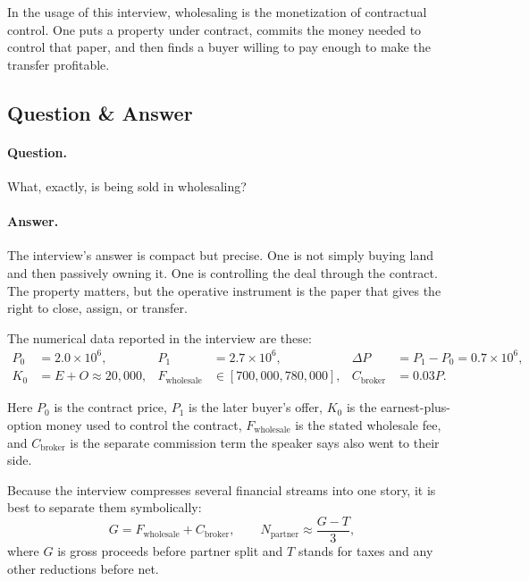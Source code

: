 \begin{definition}
In the usage of this interview, wholesaling is the monetization of contractual control. One puts a property under contract, commits the money needed to control that paper, and then finds a buyer willing to pay enough to make the transfer profitable.
\end{definition}

\subsection{Question \& Answer}

\paragraph{Question.} What, exactly, is being sold in wholesaling?

\paragraph{Answer.} The interview's answer is compact but precise. One is not simply buying land and then passively owning it. One is controlling the deal through the contract. The property matters, but the operative instrument is the paper that gives the right to close, assign, or transfer.

The numerical data reported in the interview are these:
\begin{align}
P_0 &= 2.0\times 10^6,
&
P_1 &= 2.7\times 10^6,
&
\Delta P &= P_1-P_0 = 0.7\times 10^6, \\
K_0 &= E+O \approx 20{,}000,
&
F_{\mathrm{wholesale}} &\in [700{,}000,780{,}000],
&
C_{\mathrm{broker}} &= 0.03P.
\end{align}

Here \(P_0\) is the contract price, \(P_1\) is the later buyer's offer, \(K_0\) is the earnest-plus-option money used to control the contract, \(F_{\mathrm{wholesale}}\) is the stated wholesale fee, and \(C_{\mathrm{broker}}\) is the separate commission term the speaker says also went to their side.

Because the interview compresses several financial streams into one story, it is best to separate them symbolically:
\begin{equation}
G = F_{\mathrm{wholesale}} + C_{\mathrm{broker}},
\qquad
N_{\mathrm{partner}} \approx \frac{G-T}{3},
\end{equation}
where \(G\) is gross proceeds before partner split and \(T\) stands for taxes and any other reductions before net.

